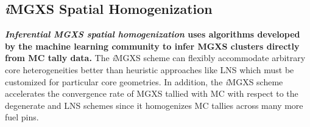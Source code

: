 \documentclass[12pt,twoside]{mitthesis-exec}
\begin{document}



\subsection*{\textit{i}MGXS Spatial Homogenization}

\textbf{\textit{Inferential MGXS spatial homogenization} uses algorithms developed by the machine learning community to infer MGXS clusters directly from MC tally data.} The \textit{i}MGXS scheme can flexibly accommodate arbitrary core heterogeneities better than heuristic approaches like LNS which must be customized for particular core geometries. In addition, the \textit{i}MGXS scheme accelerates the convergence rate of MGXS tallied with MC with respect to the degenerate and LNS schemes since it homogenizes MC tallies across many more fuel pins.

\end{document}
